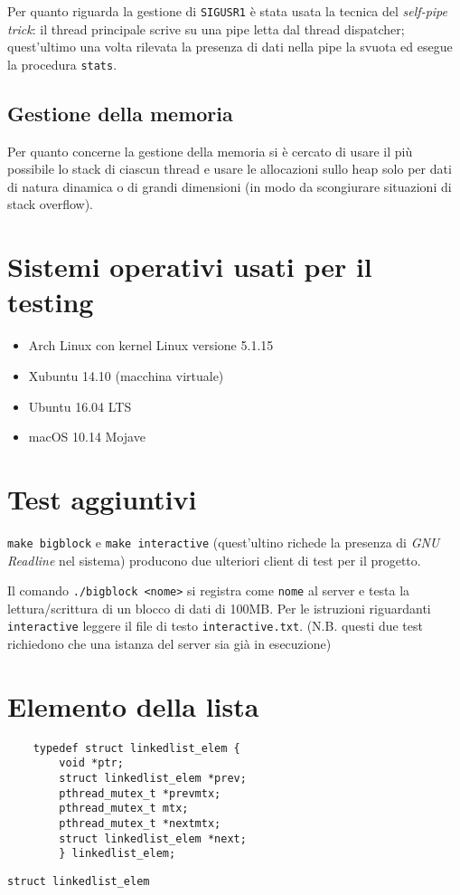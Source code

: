 \documentclass[a4paper,11pt]{article}
\begin{document}
Per quanto riguarda la gestione di \texttt{SIGUSR1} è stata usata la tecnica del \emph{self-pipe trick}: il thread principale scrive su una pipe letta dal thread dispatcher; quest'ultimo
una volta rilevata la presenza di dati nella pipe la svuota ed esegue la procedura \texttt{stats}.

\subsection{Gestione della memoria}
Per quanto concerne la gestione della memoria si è cercato di usare il più possibile lo stack di ciascun thread e usare le allocazioni sullo heap solo per dati
di natura dinamica o di grandi dimensioni (in modo da scongiurare situazioni di stack overflow).
\newpage
\begin{appendices}
\section{Sistemi operativi usati per il testing}
\begin{itemize}
    \item Arch Linux con kernel Linux versione 5.1.15
    \item Xubuntu 14.10 (macchina virtuale)
    \item Ubuntu 16.04 LTS
    \item macOS 10.14 Mojave
\end{itemize}

\section{Test aggiuntivi}
\texttt{make bigblock} e \texttt{make interactive} (quest'ultino richede la presenza di \emph{GNU Readline} nel sistema)
producono due ulteriori client di test per il progetto.

Il comando \texttt{./bigblock <nome>} si registra come \texttt{nome} al server e testa la lettura/scrittura di un blocco di dati di 100MB.
Per le istruzioni riguardanti \texttt{interactive} leggere il file di testo \texttt{interactive.txt}. 
(N.B. questi due test richiedono che una istanza del server sia già in esecuzione)
\section{Elemento della lista}
\begin{listing}[ht]
    \begin{verbatim}
    typedef struct linkedlist_elem {
        void *ptr;
        struct linkedlist_elem *prev;
        pthread_mutex_t *prevmtx;
        pthread_mutex_t mtx;
        pthread_mutex_t *nextmtx;
        struct linkedlist_elem *next;
        } linkedlist_elem;
    \end{verbatim}
    \caption{\texttt{struct linkedlist\_elem}}
\end{listing}
\end{appendices}    
\end{document}
